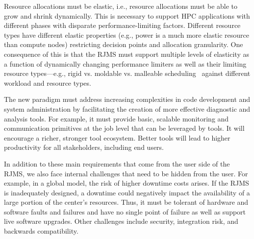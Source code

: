 Resource allocations
must be elastic, i.e., resource allocations must be able to grow and shrink
dynamically. This is necessary to support HPC applications with different
phases with disparate performance-limiting factors.
Different resource types have different
elastic properties 
(e.g., power is a much more elastic resource than compute nodes)
restricting decision points and allocation granularity.
One consequence of this is that the RJMS must 
support multiple levels of elasticity 
as a function of dynamically changing performance limiters
as well as their limiting resource types---e.g., 
rigid vs. moldable vs. malleable scheduling~\cite{Convergence} 
against different workload and resource types.

The new paradigm must address increasing complexities
in code development and system administration by facilitating
the creation of more effective diagnostic and analysis tools.
For example, it must provide basic, scalable monitoring and communication
primitives at the job level that can be leveraged by tools.
It will encourage a richer, stronger tool ecosystem.
Better tools will lead to higher productivity for all
stakeholders, including end users.

In addition to these main requirements that come from the user side
of the RJMS, we also face internal challenges that need to be hidden
from the user. 
For example, in a global model,
the risk of higher downtime costs arises. 
If the RJMS is inadequately designed, a downtime could negatively
impact the availability of a large portion of the center's
resources. Thus, it must be tolerant of hardware and software
faults and failures and have no single point of failure as well as 
support live software upgrades. 
Other challenges include security, integration risk, 
and backwards compatibility. 

%

